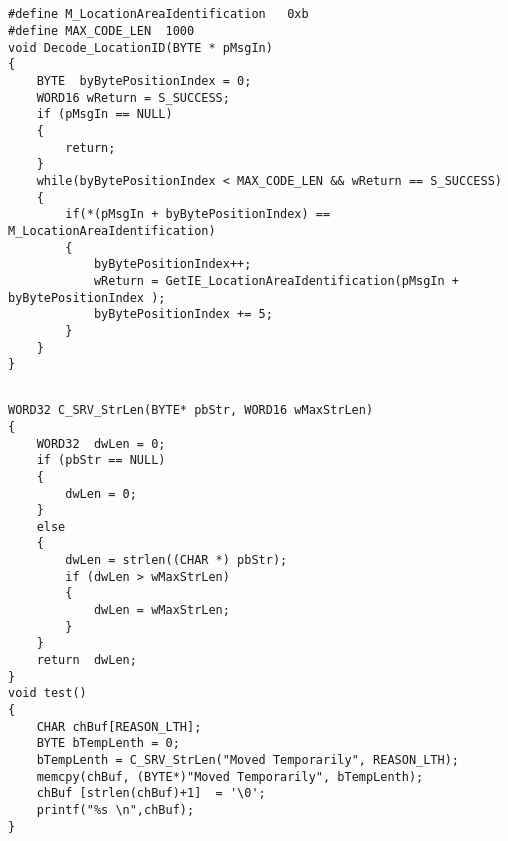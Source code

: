 ﻿\documentclass  [11pt,twocolumn]{article}
\begin{document}
\subsection{}
\begin{lstlisting}
#define M_LocationAreaIdentification   0xb
#define MAX_CODE_LEN  1000
void Decode_LocationID(BYTE * pMsgIn)
{
    BYTE  byBytePositionIndex = 0;
    WORD16 wReturn = S_SUCCESS;
    if (pMsgIn == NULL)
    {
        return;
    }
    while(byBytePositionIndex < MAX_CODE_LEN && wReturn == S_SUCCESS)
    {
	    if(*(pMsgIn + byBytePositionIndex) == M_LocationAreaIdentification)
	    {
            byBytePositionIndex++;
            wReturn = GetIE_LocationAreaIdentification(pMsgIn + byBytePositionIndex );
            byBytePositionIndex += 5;
	    }
    }
}
\end{lstlisting}

\subsection{}
\begin{lstlisting}
WORD32 C_SRV_StrLen(BYTE* pbStr, WORD16 wMaxStrLen)
{
    WORD32  dwLen = 0;
    if (pbStr == NULL)
    {
        dwLen = 0;
    }
    else
    {
        dwLen = strlen((CHAR *) pbStr);
        if (dwLen > wMaxStrLen)
        {
            dwLen = wMaxStrLen;
        }
    }
    return  dwLen;
}
void test()
{
    CHAR chBuf[REASON_LTH];
    BYTE bTempLenth = 0;
    bTempLenth = C_SRV_StrLen("Moved Temporarily", REASON_LTH);
    memcpy(chBuf, (BYTE*)"Moved Temporarily", bTempLenth);
    chBuf [strlen(chBuf)+1]  = '\0';
    printf("%s \n",chBuf);
}
\end{lstlisting}
\end{document}
